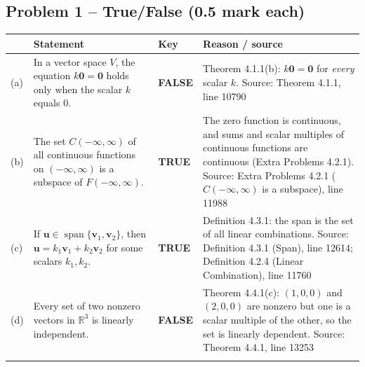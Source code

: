 \documentclass[11pt,a4paper]{article}
\newcommand{\Src}[1]{{\footnotesize\color{black!65}Source: #1}}
\begin{document}
\subsection*{Problem 1 -- True/False (0.5 mark each)}
\begin{tabularx}{\linewidth}{@{}l X l X@{}}\toprule & Statement & Key & Reason / source\\\midrule
(a) & In a vector space $V$, the equation $k\mathbf{0}=\mathbf{0}$ holds only when the scalar $k$ equals $0$. & \textbf{FALSE} & Theorem 4.1.1(b): $k\mathbf{0}=\mathbf{0}$ for \emph{every} scalar $k$. \Src{Theorem 4.1.1, line 10790}\\\addlinespace
(b) & The set $C(-\infty,\infty)$ of all continuous functions on $(-\infty,\infty)$ is a subspace of $F(-\infty,\infty)$. & \textbf{TRUE} & The zero function is continuous, and sums and scalar multiples of continuous functions are continuous (Extra Problems 4.2.1). \Src{Extra Problems 4.2.1 ($C(-\infty,\infty)$ is a subspace), line 11988}\\\addlinespace
(c) & If $\mathbf{u}\in\operatorname{span}\{\mathbf{v}_1,\mathbf{v}_2\}$, then $\mathbf{u}=k_1\mathbf{v}_1+k_2\mathbf{v}_2$ for some scalars $k_1,k_2$. & \textbf{TRUE} & Definition 4.3.1: the span is the set of all linear combinations. \Src{Definition 4.3.1 (Span), line 12614; Definition 4.2.4 (Linear Combination), line 11760}\\\addlinespace
(d) & Every set of two nonzero vectors in $\mathbb{R}^3$ is linearly independent. & \textbf{FALSE} & Theorem 4.4.1(c): $(1,0,0)$ and $(2,0,0)$ are nonzero but one is a scalar multiple of the other, so the set is linearly dependent. \Src{Theorem 4.4.1, line 13253}\\\addlinespace
\bottomrule\end{tabularx}
\end{document}
